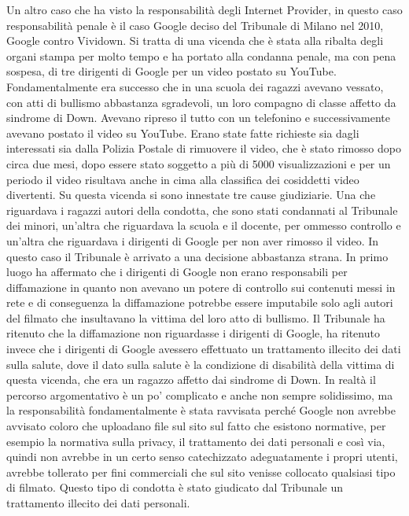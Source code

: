 Un altro caso che ha visto la responsabilità degli Internet Provider, in questo caso responsabilità penale è il caso Google deciso del Tribunale di Milano nel 2010, Google contro Vividown. Si tratta di una vicenda che è stata alla ribalta degli organi stampa per molto tempo e ha portato alla condanna penale, ma con pena sospesa, di tre dirigenti di Google per un video postato su YouTube. 
Fondamentalmente era successo che in una scuola dei ragazzi avevano vessato, con atti di bullismo abbastanza sgradevoli, un loro compagno di classe affetto da sindrome di Down. Avevano ripreso il tutto con un telefonino e successivamente avevano postato il video su YouTube. Erano state fatte richieste sia dagli interessati sia dalla Polizia Postale di rimuovere il video, che è stato rimosso dopo circa due mesi, dopo essere stato soggetto a più di 5000 visualizzazioni e per un periodo il video risultava anche in cima alla classifica dei cosiddetti video divertenti.
Su questa vicenda si sono innestate tre cause giudiziarie. Una che riguardava i ragazzi autori della condotta, che sono stati condannati al Tribunale dei minori, un'altra che riguardava la scuola e il docente, per ommesso controllo e un'altra che riguardava i dirigenti di Google per non aver rimosso il video. In questo caso il Tribunale è arrivato a una decisione abbastanza strana. In primo luogo ha affermato che i dirigenti di Google non erano responsabili per diffamazione in quanto non avevano un potere di controllo sui contenuti messi in rete e di conseguenza la diffamazione potrebbe essere imputabile solo agli autori del filmato che insultavano la vittima del loro atto di bullismo. 
Il Tribunale ha ritenuto che la diffamazione non riguardasse i dirigenti di Google, ha ritenuto invece che i dirigenti di Google avessero effettuato un trattamento illecito dei dati sulla salute, dove il dato sulla salute è la condizione di disabilità della vittima di questa vicenda, che era un ragazzo affetto dai sindrome di Down. 
In realtà il percorso argomentativo è un po' complicato e anche non sempre solidissimo, ma la responsabilità fondamentalmente è stata ravvisata perché Google non avrebbe avvisato coloro che uploadano file sul sito sul fatto che esistono normative, per esempio la normativa sulla privacy, il trattamento dei dati personali e così via, quindi non avrebbe in un certo senso catechizzato adeguatamente i propri utenti, avrebbe tollerato per fini commerciali che sul sito venisse collocato qualsiasi tipo di filmato. 
Questo tipo di condotta è stato giudicato dal Tribunale un trattamento illecito dei dati personali. 

